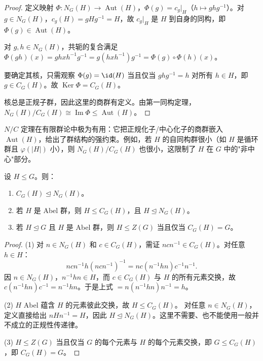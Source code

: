 \begin{proof}
定义映射 $\Phi:N_G(H)\to\operatorname{Aut}(H)$，$\Phi(g)=c_g|_H$（$h\mapsto ghg^{-1}$）。对 $g\in N_G(H)$，$c_g(H)=gHg^{-1}=H$，故 $c_g|_H$ 是 $H$ 到自身的同构，即 $\Phi(g)\in\operatorname{Aut}(H)$。

对 $g,h\in N_G(H)$，共轭的复合满足 $\Phi(gh)(x)=ghxh^{-1}g^{-1}=g(hxh^{-1})g^{-1}=\Phi(g)\circ\Phi(h)(x)$。

要确定其核，只需观察 $\Phi(g)=\id(H)$ 当且仅当 $ghg^{-1}=h$ 对所有 $h\in H$，即 $g\in C_G(H)$。故 $\operatorname{Ker}\Phi=C_G(H)$。

核总是正规子群，因此这里的商群有定义。由第一同构定理，$N_G(H)/C_G(H)\cong\operatorname{Im}\Phi\leqslant\operatorname{Aut}(H)$。
\end{proof}

$N/C$ 定理在有限群论中极为有用：它把正规化子/中心化子的商群嵌入 $\operatorname{Aut}(H)$，给出了群结构的强约束。例如，若 $H$ 的自同构群很小（如 $H$ 是循环群且 $\varphi(|H|)$ 小），则 $N_G(H)/C_G(H)$ 也很小，这限制了 $H$ 在 $G$ 中的"非中心"部分。

\begin{proposition}[中心化子的正规化子性质]
\label{prop:centralizer-normalizer}
设 $H\leqslant G$。则：
\begin{enumerate}
\item $C_G(H)\mathrel{\trianglelefteq} N_G(H)$。
\item 若 $H$ 是 Abel 群，则 $H\leqslant C_G(H)$，且 $H\mathrel{\trianglelefteq} N_G(H)$。
\item 若 $H\mathrel{\trianglelefteq} G$ 且 $H$ 是 Abel 群，则 $H\leqslant Z(G)$ 当且仅当 $C_G(H)=G$。
\end{enumerate}
\end{proposition}

\begin{proof}
(1) 对 $n\in N_G(H)$ 和 $c\in C_G(H)$，需证 $ncn^{-1}\in C_G(H)$。对任意 $h\in H$：
\[
ncn^{-1}h(ncn^{-1})^{-1}=nc(n^{-1}hn)c^{-1}n^{-1}.
\]
因 $n\in N_G(H)$，$n^{-1}hn\in H$，而 $c\in C_G(H)$ 与 $H$ 的所有元素交换，故 $c(n^{-1}hn)c^{-1}=n^{-1}hn$。于是上式 $=n(n^{-1}hn)n^{-1}=h$。

(2) $H$ Abel 蕴含 $H$ 的元素彼此交换，故 $H\leqslant C_G(H)$。
对任意 $n\in N_G(H)$，定义直接给出 $nHn^{-1}=H$，因此
$H\mathrel{\trianglelefteq}N_G(H)$。这里不需要、也不能使用一般并不成立的正规性传递律。

(3) $H\leqslant Z(G)$ 当且仅当 $G$ 的每个元素与 $H$ 的每个元素交换，即 $G\leqslant C_G(H)$，即 $C_G(H)=G$。
\end{proof}

